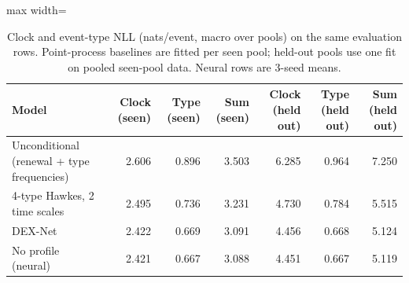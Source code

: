 \begin{table}[t]
\centering
\small
\caption{Clock and event-type NLL (nats/event, macro over pools) on the same evaluation rows. Point-process baselines are fitted per seen pool; held-out pools use one fit on pooled seen-pool data. Neural rows are 3-seed means.}
\label{tab:point_process_baselines}
\begin{adjustbox}{max width=\linewidth}
\begin{tabular}{lrrrrrr}
\toprule
Model & Clock (seen) & Type (seen) & Sum (seen) & Clock (held out) & Type (held out) & Sum (held out) \\
\midrule
Unconditional (renewal + type frequencies) & 2.606 & 0.896 & 3.503 & 6.285 & 0.964 & 7.250 \\
4-type Hawkes, 2 time scales & 2.495 & 0.736 & 3.231 & 4.730 & 0.784 & 5.515 \\
DEX-Net & 2.422 & 0.669 & 3.091 & 4.456 & 0.668 & 5.124 \\
No profile (neural) & 2.421 & 0.667 & 3.088 & 4.451 & 0.667 & 5.119 \\
\bottomrule
\end{tabular}
\end{adjustbox}
\end{table}

